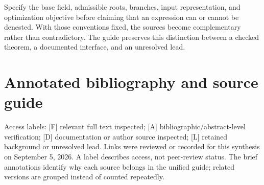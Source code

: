 \documentclass[11pt,oneside]{article}
\numberwithin{equation}{section}
\theoremstyle{definition}
\theoremstyle{remark}
\newcommand{\status}[1]{\textsf{\small[#1]}}
\begin{document}
Specify the base field, admissible roots, branches, input representation, and optimization objective before claiming that an expression can or cannot be denested. With those conventions fixed, the sources become complementary rather than contradictory. The guide preserves this distinction between a checked theorem, a documented interface, and an unresolved lead.

\clearpage
\section*{Annotated bibliography and source guide}
\noindent Access labels: \status{F} relevant full text inspected; \status{A} bibliographic/abstract-level verification; \status{D} documentation or author source inspected; \status{L} retained background or unresolved lead. Links were reviewed or recorded for this synthesis on September 5, 2026. A label describes access, not peer-review status. The brief annotations identify why each source belongs in the unified guide; related versions are grouped instead of counted repeatedly.
\end{document}
